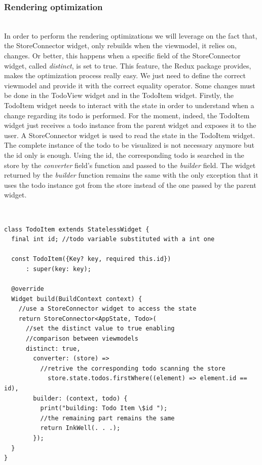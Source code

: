\subsubsection{Rendering optimization}  \label{par:todo_app_inherited_widget_introduction}
\hfill\\
In order to perform the rendering optimizations we will leverage on the fact that, the StoreConnector widget, only rebuilds when the viewmodel, it relies on, changes. Or better, this happens when a specific field of the StoreConnector widget, called \textit{distinct}, is set to true. This feature, the Redux package provides, makes the optimization process really easy. We just need to define the correct viewmodel and provide it with the correct equality operator. Some changes must be done in the TodoView widget and in the TodoItem widget. Firstly, the TodoItem widget needs to interact with the state in order to understand when a change regarding its todo is performed. For the moment, indeed, the TodoItem widget just receives a todo instance from the parent widget and exposes it to the user. A StoreConnector widget is used to read the state in the TodoItem widget. The complete instance of the todo to be visualized is not necessary anymore but the id only is enough. Using the id,  the corresponding todo is searched in the store by the \textit{converter} field’s function and passed to the \textit{builder} field. The widget returned by the \textit{builder} function remains the same with the only exception that it uses the todo instance got from the store instead of the one passed by the parent widget. 
\begin{code}
\mbox{}\\
 \mbox{}
		\label{code:2.14}
\begin{verbatim}
class TodoItem extends StatelessWidget {
  final int id; //todo variable substituted with a int one

  const TodoItem({Key? key, required this.id})
      : super(key: key);

  @override
  Widget build(BuildContext context) {
    //use a StoreConnector widget to access the state
    return StoreConnector<AppState, Todo>(
      //set the distinct value to true enabling 
      //comparison between viewmodels
      distinct: true, 
        converter: (store) =>
          //retrive the corresponding todo scanning the store
            store.state.todos.firstWhere((element) => element.id == id),
        builder: (context, todo) {
          print("building: Todo Item \$id ");
          //the remaining part remains the same
          return InkWell(. . .);
        });
  }
}
\end{verbatim}
\mbox{}
\end{code}

